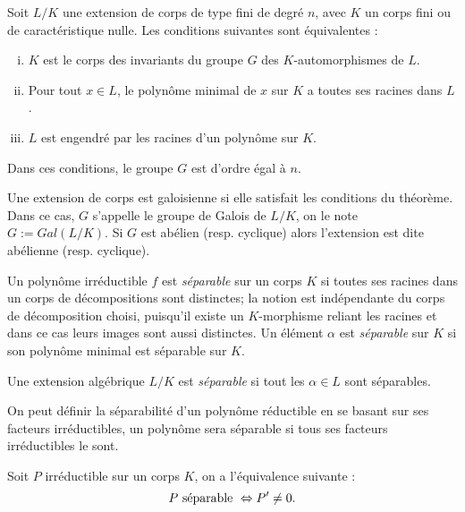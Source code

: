 \documentclass[a4paper]{article} %
\numberwithin{section}{part}
\numberwithin{equation}{section}
\begin{document}
\begin{thm}
Soit $L/K$ une extension de corps de type fini de degré $n$, avec $K$ un corps
fini ou de caractéristique nulle. Les conditions suivantes sont équivalentes :
\begin{enumerate}[(i)]
	\item $K$ est le corps des invariants du groupe $G$ des $K$-automorphismes
de $L$.
	\item Pour tout $x\in L$, le polynôme minimal de $x$ sur $K$ a toutes ses
racines dans $L$.
	\item $L$ est engendré par les racines d'un polynôme sur $K$.
\end{enumerate}
Dans ces conditions, le groupe $G$ est d'ordre égal à $n$.
\end{thm}

\begin{defn}
\label{def:gal}
Une extension de corps est galoisienne si elle satisfait les
conditions du théorème. Dans ce cas, $G$ s'appelle le groupe de Galois de $L/K$,
on le note $G := Gal(L/K)$. Si $G$ est abélien (resp. cyclique) alors 
l'extension est dite abélienne (resp. cyclique).
\end{defn}

Un polynôme irréductible $f$ est \emph{séparable} sur un corps $K$ si toutes
ses racines dans un corps de décompositions sont distinctes; la notion est
indépendante du corps de décomposition choisi, puisqu'il existe un $K$-morphisme
reliant les racines et dans ce cas leurs images sont aussi distinctes. 
Un élément $\alpha$ est \emph{séparable} sur $K$ si son polynôme minimal est 
séparable sur $K$.

\begin{defn}
\label{def:sep}
Une extension algébrique $L/K$ est \emph{séparable} si tout les $\alpha\in L$
sont séparables.
\end{defn}

\begin{rem}
On peut définir la séparabilité d'un polynôme réductible en se basant sur ses
facteurs irréductibles, un polynôme sera séparable si tous ses facteurs
irréductibles le sont.
\end{rem}

\begin{prop}
\label{prop:sepderiv}
Soit $P$ irréductible sur un corps $K$, on a l'équivalence suivante :
\begin{equation}
P\textup{ séparable } \Leftrightarrow P'\neq 0.
\end{equation}
\end{prop}
\end{document}

